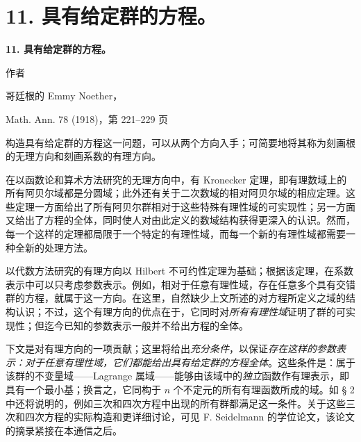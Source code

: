 \section*{11. 具有给定群的方程。}
\begin{center}
{\Large\bfseries 11. 具有给定群的方程。}\par
\vspace{0.75em}
作者\par
\vspace{0.75em}
哥廷根的 Emmy Noether，\par
\vspace{1.5em}
Math. Ann. 78 (1918)，第 221--229 页
\end{center}

\vspace{4em}

构造具有给定群的方程这一问题，可以从两个方向入手；可简要地将其称为刻画根的\glqq{}无理\grqq{}方向和刻画系数的\glqq{}有理\grqq{}方向。

在以函数论和算术方法研究的\glqq{}无理\grqq{}方向中，有 Kronecker 定理，即有理数域上的所有阿贝尔域都是分圆域；此外还有关于二次数域的相对阿贝尔域的相应定理。这些定理一方面给出了所有阿贝尔群相对于这些特殊有理性域的可实现性；另一方面又给出了方程的全体，同时使人对由此定义的数域结构获得更深入的认识。然而，每一个这样的定理都局限于一个特定的有理性域，而每一个新的有理性域都需要一种全新的处理方法。

以代数方法研究的\glqq{}有理\grqq{}方向以 Hilbert 不可约性定理为基础；根据该定理，在系数表示中可以只考虑参数表示。例如，相对于任意有理性域，存在任意多个具有交错群的方程，就属于这一方向。在这里，自然缺少上文所述的对方程所定义之域的结构认识；不过，这个\glqq{}有理\grqq{}方向的优点在于，它同时对\emph{所有有理性域}证明了群的可实现性；但迄今已知的参数表示一般并不给出方程的全体。 

下文是对\glqq{}有理\grqq{}方向的一项贡献；这里将给出\emph{充分条件}，以保证\emph{存在这样的参数表示：对于任意有理性域，它们都能给出具有给定群的方程全体}。这些条件是：属于该群的不变量域——Lagrange 属域——能够由该域中的\emph{独立}函数作有理表示，即具有一个\glqq{}最小基\grqq{}；换言之，它同构于 $n$ 个不定元的所有有理函数所成的域。如 § 2 中还将说明的，例如三次和四次方程中出现的所有群都满足这一条件。关于这些三次和四次方程的实际构造和更详细讨论，可见 F. Seidelmann 的学位论文，该论文的摘录紧接在本通信之后。

